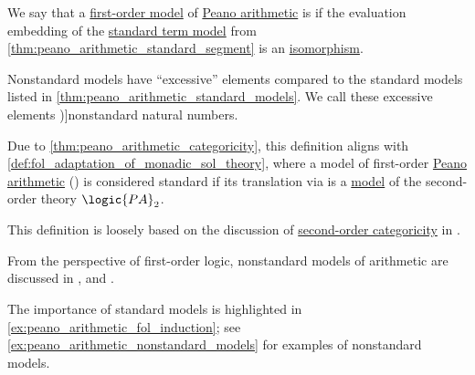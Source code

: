 \begin{definition}\label{def:peano_arithmetic_standard_model}\mimprovised
  We say that a \hyperref[def:fol_semantics/model]{first-order model} of \hyperref[def:peano_arithmetic]{Peano arithmetic} is  if the evaluation embedding of the \hyperref[def:peano_arithmetic_term_model]{standard term model} from \cref{thm:peano_arithmetic_standard_segment} is an \hyperref[def:fol_isomorphism]{isomorphism}.

  Nonstandard models have \enquote{excessive} elements compared to the standard models listed in \cref{thm:peano_arithmetic_standard_models}. We call these excessive elements \term[en=non-standard elements (\cite[def. 2.5.10]{Hinman2005Logic})]{nonstandard natural numbers}.
\end{definition}
\begin{comments}
  \item Due to \cref{thm:peano_arithmetic_categoricity}, this definition aligns with \cref{def:fol_adaptation_of_monadic_sol_theory}, where a model of first-order \hyperref[def:peano_arithmetic]{Peano arithmetic} () is considered standard if its translation via  is a \hyperref[def:hol_semantics/model]{model} of the second-order theory \( \logic{PA}_2 \).

  \item This definition is loosely based on the discussion of \hyperref[def:hol_theory/categorical]{second-order categoricity} in \cite[\S 5]{Farmer2008STTVirtues}.

  From the perspective of first-order logic, nonstandard models of arithmetic are discussed in \cite[\S 2.5]{Hinman2005Logic}, \cite[\S 3.2]{VanDalen2004LogicAndStructure} and \cite[\S 3.3.2]{Герасимов2014Вычислимость}.

  \item The importance of standard models is highlighted in \cref{ex:peano_arithmetic_fol_induction}; see \cref{ex:peano_arithmetic_nonstandard_models} for examples of nonstandard models.
\end{comments}

